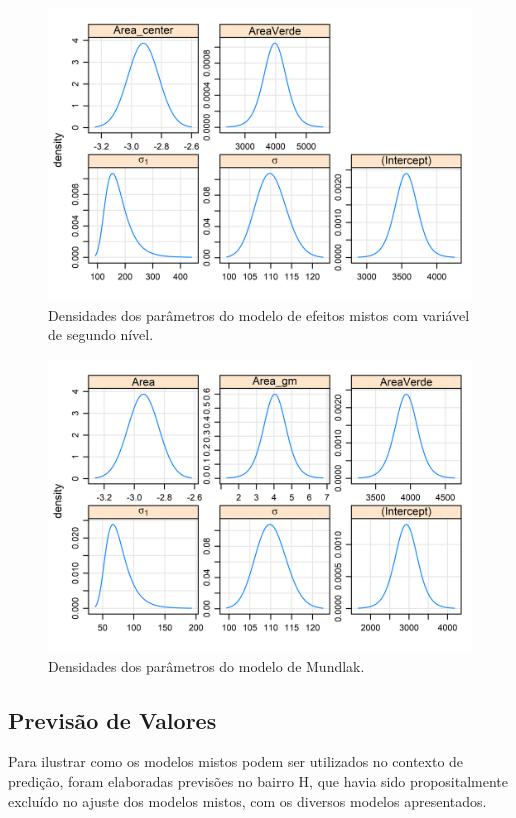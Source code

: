 \documentclass[
  a4paper, 11pt]{article}
\begin{document}
\begin{figure}[H]

{\centering \includegraphics[width=0.75\linewidth]{images/pr1-1} 

}

\caption{Densidades dos parâmetros do modelo de efeitos mistos com variável de segundo nível.}\label{fig:pr1}
\end{figure}
\begin{figure}[H]

{\centering \includegraphics[width=0.75\linewidth]{images/pr2-1} 

}

\caption{Densidades dos parâmetros do modelo de Mundlak.}\label{fig:pr2}
\end{figure}

\hypertarget{previsuxe3o-de-valores}{%
\subsection{Previsão de Valores}\label{previsuxe3o-de-valores}}

Para ilustrar como os modelos mistos podem ser utilizados no contexto de
predição, foram elaboradas previsões no bairro H, que havia sido
propositalmente excluído no ajuste dos modelos mistos, com os diversos
modelos apresentados.
\end{document}

